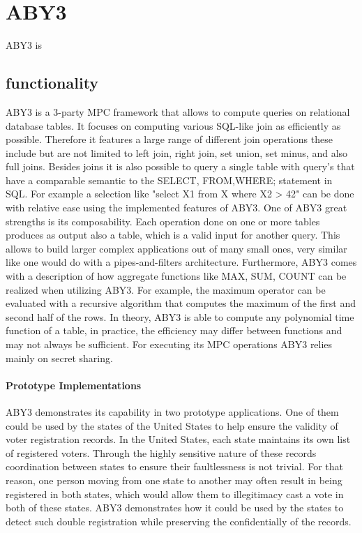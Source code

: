 \section{ABY3}
ABY3 is 
\subsection{functionality }
ABY3 is a 3-party MPC framework that allows to compute queries on relational database tables. It focuses on computing various SQL-like join as efficiently as possible. Therefore it features a large range of different join operations these include but are not limited to left join, right join, set union, set minus, and also full joins.  
Besides joins it is also possible to query a single table with query's that have a comparable semantic to the SELECT, FROM,WHERE; statement in SQL. For example a selection like "select X1 from X  where X2 > 42" can be done with relative ease using the implemented features of ABY3. One of ABY3 great strengths is its composability.
Each operation done on one or more tables produces as output also a table, which is a valid input for another query. This allows to build larger complex applications out of many small ones, very similar like one would do with a pipes-and-filters architecture. 
Furthermore, ABY3 comes with a description of how aggregate functions like MAX, SUM, COUNT can be realized when utilizing ABY3. For example, the maximum operator can be evaluated with a recursive algorithm that computes the maximum of the first and second half of the rows. In theory, ABY3 is able to compute any polynomial time function of a table, in practice, the efficiency may differ between functions and may not always be sufficient.   For executing its MPC operations ABY3 relies mainly on secret sharing.


\paragraph{Prototype Implementations}
ABY3 demonstrates its capability in two prototype applications. One of them could be used by the states of the United States to help ensure the validity of voter registration records. In the United States, each state maintains its own list of registered voters. Through the highly sensitive nature of these records coordination between states to ensure their faultlessness is not trivial. For that reason, one person moving from one state to another may often result in being registered in both states, which would allow them to illegitimacy cast a vote in both of these states.
ABY3 demonstrates how it could be used by the states to detect such double registration while preserving the confidentially of the records. 



